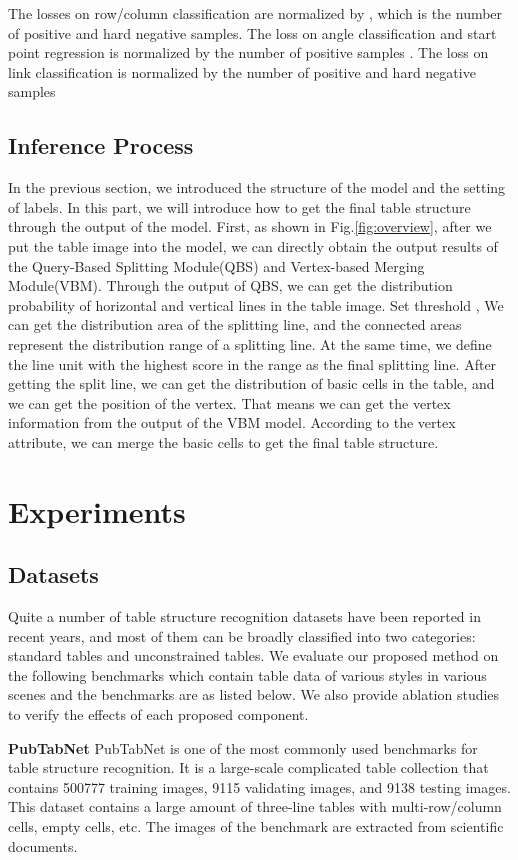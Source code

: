 \documentclass[lettersize,journal]{IEEEtran}
\begin{document}
The losses on row/column classification are normalized by , which is the number of positive and hard negative samples. The loss on angle classification and start point regression is normalized by the number of positive samples . The loss on link classification is normalized by the number of positive and hard negative samples 


\subsection{Inference Process}
In the previous section, we introduced the structure of the model and the setting of labels. In this part, we will introduce how to get the final table structure through the output of the model. First, as shown in Fig.\ref{fig:overview}, after we put the table image into the model, we can directly obtain the output results of the Query-Based Splitting Module(QBS) and Vertex-based Merging Module(VBM). Through the output of QBS, we can get the distribution probability of horizontal and vertical lines in the table image. Set threshold , We can get the distribution area of the splitting line, and the connected areas represent the distribution range of a splitting line. At the same time, we define the line unit with the highest score in the range as the final splitting line. After getting the split line, we can get the distribution of basic cells in the table, and we can get the position of the vertex. That means we can get the vertex information from the output of the VBM model. According to the vertex attribute, we can merge the basic cells to get the final table structure.


\section{Experiments}
\subsection{Datasets}
Quite a number of table structure recognition datasets have been reported in recent years, and most of them can be broadly classified into two categories: standard tables and unconstrained tables. We evaluate our proposed method on the following benchmarks which contain table data of various styles in various scenes and the benchmarks are as listed below. We also provide ablation studies to verify the effects of each proposed component.

\textbf{PubTabNet\cite{zhong2020image}} PubTabNet is one of the most commonly used benchmarks for table structure recognition. It is a large-scale complicated table collection that contains 500777 training images, 9115 validating images, and 9138 testing images. This dataset contains a large amount of three-line tables with multi-row/column cells, empty cells, etc. The images of the benchmark are extracted from scientific documents.
\end{document}
